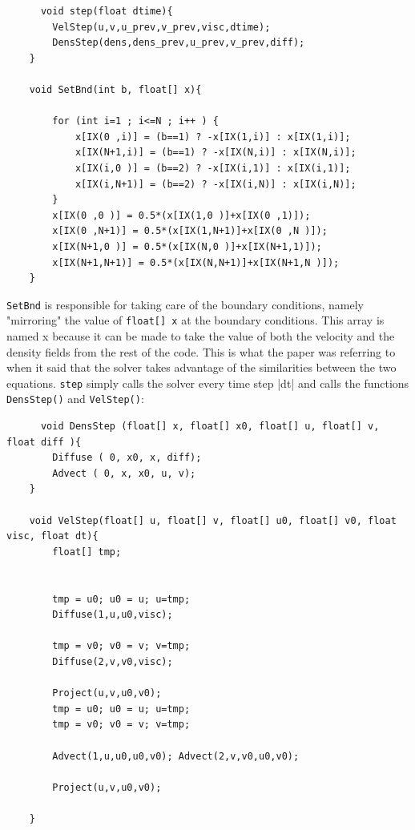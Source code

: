 \documentclass[12pt,a4paper]{book}
\begin{document}
\begin{lstlisting}
	  void step(float dtime){
		VelStep(u,v,u_prev,v_prev,visc,dtime);
		DensStep(dens,dens_prev,u_prev,v_prev,diff);
	}
	
	void SetBnd(int b, float[] x){
		
		for (int i=1 ; i<=N ; i++ ) {
			x[IX(0 ,i)] = (b==1) ? -x[IX(1,i)] : x[IX(1,i)];
			x[IX(N+1,i)] = (b==1) ? -x[IX(N,i)] : x[IX(N,i)];
			x[IX(i,0 )] = (b==2) ? -x[IX(i,1)] : x[IX(i,1)];
			x[IX(i,N+1)] = (b==2) ? -x[IX(i,N)] : x[IX(i,N)];
		}
		x[IX(0 ,0 )] = 0.5*(x[IX(1,0 )]+x[IX(0 ,1)]);
		x[IX(0 ,N+1)] = 0.5*(x[IX(1,N+1)]+x[IX(0 ,N )]);
		x[IX(N+1,0 )] = 0.5*(x[IX(N,0 )]+x[IX(N+1,1)]);
		x[IX(N+1,N+1)] = 0.5*(x[IX(N,N+1)]+x[IX(N+1,N )]);
	}
\end{lstlisting} 
\verb|SetBnd| is responsible for taking care of the boundary conditions, namely "mirroring" the value of \verb|float[] x| at the boundary conditions. This array is named x because it can be made to take the value of both the velocity and the density fields from the rest of the code. This is what the paper was referring to when it said that the solver takes advantage of the similarities between the two equations. \verb|step| simply calls the solver every time step |dt| and calls the functions \verb|DensStep()| and \verb|VelStep()|:
\begin{lstlisting}
	  void DensStep (float[] x, float[] x0, float[] u, float[] v, float diff ){
		Diffuse ( 0, x0, x, diff);
		Advect ( 0, x, x0, u, v);
	}
	
	void VelStep(float[] u, float[] v, float[] u0, float[] v0, float visc, float dt){
		float[] tmp;
		
		
		tmp = u0; u0 = u; u=tmp;
		Diffuse(1,u,u0,visc);
		
		tmp = v0; v0 = v; v=tmp;
		Diffuse(2,v,v0,visc);
		
		Project(u,v,u0,v0);
		tmp = u0; u0 = u; u=tmp;
		tmp = v0; v0 = v; v=tmp;
		
		Advect(1,u,u0,u0,v0); Advect(2,v,v0,u0,v0);
		
		Project(u,v,u0,v0);
		
	}

\end{lstlisting}
\end{document}
